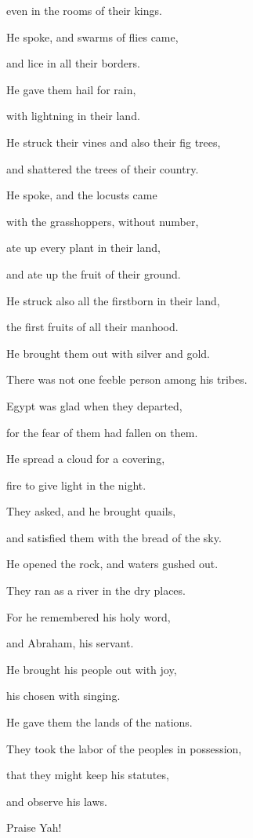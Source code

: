 {\par }{\QB even in the rooms of their kings.
\par }{\Q {}He spoke, and swarms of flies came,
\par }{\QB and lice in all their borders.
\par }{\Q {}He gave them hail for rain,
\par }{\QB with lightning in their land.
\par }{\Q {}He struck their vines and also their fig trees,
\par }{\QB and shattered the trees of their country.
\par }{\Q {}He spoke, and the locusts came
\par }{\QB with the grasshoppers, without number,
\par }{\Q {}ate up every plant in their land,
\par }{\QB and ate up the fruit of their ground.
\par }{\Q {}He struck also all the firstborn in their land,
\par }{\QB the first fruits of all their manhood.
\par }{\Q {}He brought them out with silver and gold.
\par }{\QB There was not one feeble person among his tribes.
\par }{\Q {}Egypt was glad when they departed,
\par }{\QB for the fear of them had fallen on them.
\par }{\Q {}He spread a cloud for a covering,
\par }{\QB fire to give light in the night.
\par }{\Q {}They asked, and he brought quails,
\par }{\QB and satisfied them with the bread of the sky.
\par }{\Q {}He opened the rock, and waters gushed out.
\par }{\QB They ran as a river in the dry places.
\par }{\Q {}For he remembered his holy word,
\par }{\QB and Abraham, his servant.
\par }{\Q {}He brought his people out with joy,
\par }{\QB his chosen with singing.
\par }{\Q {}He gave them the lands of the nations.
\par }{\QB They took the labor of the peoples in possession,
\par }{\Q {}that they might keep his statutes,
\par }{\QB and observe his laws.
\par }{\QB Praise Yah!

}
